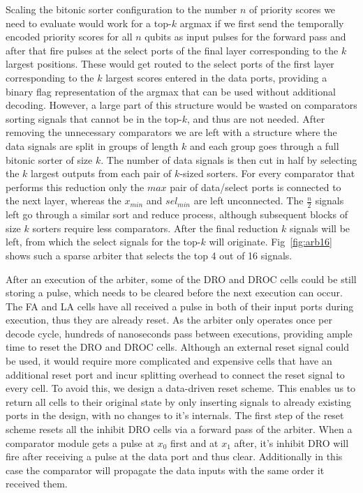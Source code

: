 \documentclass[conference]{IEEEtran}
\begin{document}
Scaling the bitonic sorter configuration to the number $n$ of priority scores we need to evaluate would work for a top-$k$ argmax if we first send the temporally encoded priority scores for all $n$ qubits as input pulses for the forward pass and after that fire pulses at the select ports of the final layer corresponding to the $k$ largest positions.
These would get routed to the select ports of the first layer corresponding to the $k$ largest scores entered in the data ports, providing a binary flag representation of the argmax that can be used without additional decoding.
However, a large part of this structure would be wasted on comparators sorting signals that cannot be in the top-$k$, and thus are not needed.
After removing the unnecessary comparators we are left with a structure where the data signals are split in groups of length $k$ and each group goes through a full bitonic sorter of size $k$.
The number of data signals is then cut in half by selecting the $k$ largest outputs from each pair of $k$-sized sorters.
For every comparator that performs this reduction only the $max$ pair of data/select ports is connected to the next layer, whereas the $x_{min}$ and $sel_{min}$ are left unconnected.
The $\frac{n}{2}$ signals left go through a similar sort and reduce process, although subsequent blocks of size $k$ sorters require less comparators. 
After the final reduction $k$ signals will be left, from which the select signals for the top-$k$ will originate.
Fig~\ref{fig:arb16} shows such a sparse arbiter that selects the top 4 out of 16 signals.

After an execution of the arbiter, some of the DRO and DROC cells could be still storing a pulse, which needs to be cleared before the next execution can occur.
The FA and LA cells have all received a pulse in both of their input ports during execution, thus they are already reset.
As the arbiter only operates once per decode cycle, hundreds of nanoseconds pass between executions, providing ample time to reset the DRO and DROC cells.
Although an external reset signal could be used, it would require more complicated and expensive cells that have an additional reset port and incur splitting overhead to connect the reset signal to every cell.
To avoid this, we design a data-driven reset scheme.
This enables us to return all cells to their original state by only inserting signals to already existing ports in the design, with no changes to it's internals.
The first step of the reset scheme resets all the inhibit DRO cells via a forward pass of the arbiter.
When a comparator module gets a pulse at $x_0$ first and at $x_1$ after, it's inhibit DRO will fire after receiving a pulse at the data port and thus clear.
Additionally in this case the comparator will propagate the data inputs with the same order it received them.
\end{document}
